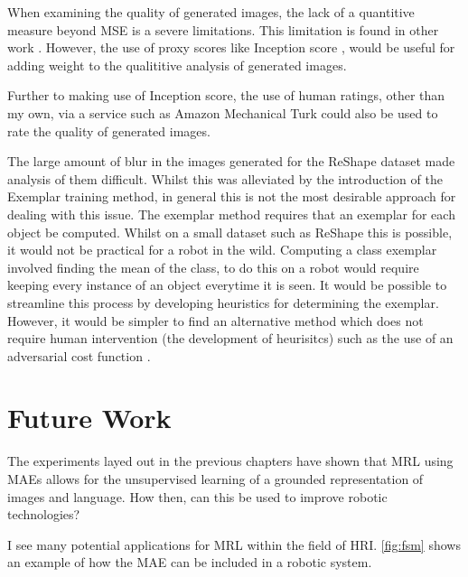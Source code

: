 When examining the quality of generated images, the lack of a quantitive measure beyond \ac{MSE} is a severe limitations. This limitation is found in other work \cite{reed2016generative, zhang2017stackgan, xu2018attngan, li2018video, mansimov2015generating}. However, the use of proxy scores like Inception score \cite{zhang2017stackgan}, would be useful for adding weight to the qualititive analysis of generated images.

Further to making use of Inception score, the use of human ratings, other than my own, via a service such as Amazon Mechanical Turk could also be used to rate the quality of generated images.

The large amount of blur in the images generated for the ReShape dataset made analysis of them difficult. Whilst this was alleviated by the introduction of the Exemplar training method, in general this is not the most desirable approach for dealing with this issue. The exemplar method requires that an exemplar for each object be computed. Whilst on a small dataset such as ReShape this is possible, it would not be practical for a robot in the wild. Computing a class exemplar involved finding the mean of the class, to do this on a robot would require keeping every instance of an object everytime it is seen. It would be possible to streamline this process by developing heuristics for determining the exemplar. However, it would be simpler to find an alternative method which does not require human intervention (the development of heurisitcs) such as the use of an adversarial cost function \cite{reed2016generative}.

\section{Future Work}
The experiments layed out in the previous chapters have shown that \ac{MRL} using \acp{MAE} allows for the unsupervised learning of a grounded representation of images and language. How then, can this be used to improve robotic technologies?

I see many potential applications for \ac{MRL} within the field of \ac{HRI}. \autoref{fig:fsm} shows an example of how the \ac{MAE} can be included in a robotic system.


